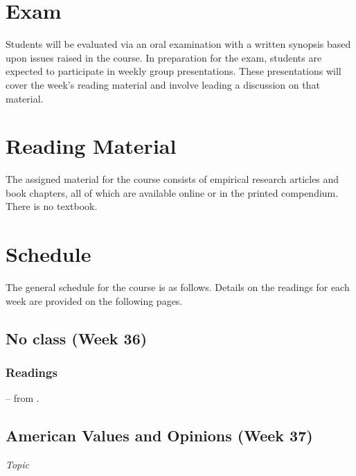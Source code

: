 \documentclass[12pt,a4paper]{article}
\newcommand{\reading}[2][]{\noindent --{#1} from \bibentry{#2}.\vspace{.25em}\\}
\begin{document}
\section{Exam}
Students will be evaluated via an oral examination with a written synopsis based upon issues raised in the course. In preparation for the exam, students are expected to participate in weekly group presentations. These presentations will cover the week's reading material and involve leading a discussion on that material.

\section{Reading Material}
The assigned material for the course consists of empirical research articles and book chapters, all of which are available online or in the printed compendium. There is no textbook.

\section{Schedule}
The general schedule for the course is as follows. Details on the readings for each week are provided on the following pages.

\secttoc


\clearpage


\subsection{No class (Week 36)}
\vspace{1em}

\subsubsection*{Readings}
\reading{Noel2010} %






\clearpage
\subsection{American Values and Opinions (Week 37)}
\emph{Topic}
\vspace{1em}
\end{document}

